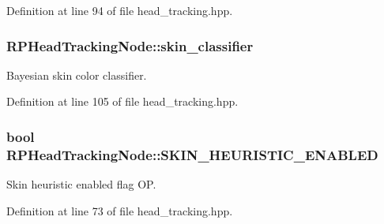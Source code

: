 \-Definition at line 94 of file head\-\_\-tracking.\-hpp.

\hypertarget{class_r_p_head_tracking_node_a0e3291a73d232c4725902b829cd40b2b}{
\subsubsection[{skin\-\_\-classifier}]{ {\bf \-R\-P\-Head\-Tracking\-Node\-::skin\-\_\-classifier}}}\label{class_r_p_head_tracking_node_a0e3291a73d232c4725902b829cd40b2b}
\-Bayesian skin color classifier. 

\-Definition at line 105 of file head\-\_\-tracking.\-hpp.

\hypertarget{class_r_p_head_tracking_node_a164b614083d44aac085c856674170506}{
\subsubsection[{\-S\-K\-I\-N\-\_\-\-H\-E\-U\-R\-I\-S\-T\-I\-C\-\_\-\-E\-N\-A\-B\-L\-E\-D}]{\setlength{\rightskip}{0pt plus 5cm}bool {\bf \-R\-P\-Head\-Tracking\-Node\-::\-S\-K\-I\-N\-\_\-\-H\-E\-U\-R\-I\-S\-T\-I\-C\-\_\-\-E\-N\-A\-B\-L\-E\-D}}}\label{class_r_p_head_tracking_node_a164b614083d44aac085c856674170506}
\-Skin heuristic enabled flag \-O\-P. 

\-Definition at line 73 of file head\-\_\-tracking.\-hpp.

